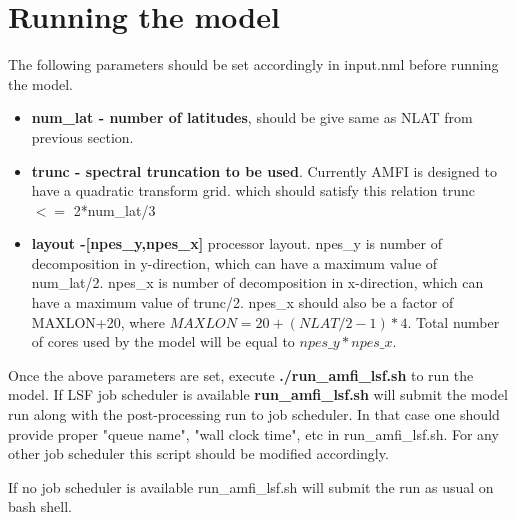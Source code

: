 \documentclass{article}
\begin{document}
\section{Running the model}
The following parameters should be set accordingly in input.nml before running the model.
\begin{itemize}
    \item \textbf{num\_lat - number of latitudes}, should be give same as NLAT from previous section.
    \item \textbf{trunc - spectral truncation to be used}. Currently AMFI is designed to have a quadratic transform grid. which should satisfy this relation trunc $<=$ 2*num\_lat/3
    \item \textbf{layout -[npes\_y,npes\_x]} processor layout. npes\_y is number of decomposition in y-direction, which can have a maximum value of num\_lat/2. npes\_x is number of decomposition in x-direction, which can have a maximum value of trunc/2. npes\_x should also be a factor of MAXLON+20, where $ MAXLON=20+(NLAT/2-1)*4$. Total number of cores used by the model will be equal to $npes\_y*npes\_x$.
    
\end{itemize}
Once the above parameters are set, execute \textbf{./run\_amfi\_lsf.sh} to run the model. 
If LSF job scheduler is available \textbf{run\_amfi\_lsf.sh} will submit the model run along with the post-processing run to job scheduler. In that case one should provide proper "queue name", "wall clock time", etc in run\_amfi\_lsf.sh. For any other job scheduler this script should be modified accordingly.

If no job scheduler is available run\_amfi\_lsf.sh will submit the run as usual on bash shell.
\end{document}
